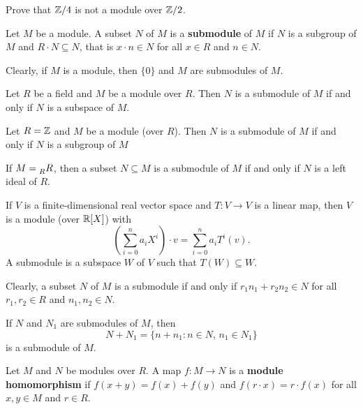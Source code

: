 \begin{exercise}
	\label{xca:Z4overZ2}
	Prove that $\mathbb{Z}/4$ is not a module over $\mathbb{Z}/2$. 
\end{exercise}

\begin{definition}
	Let $M$ be a module. A subset $N$ of $M$ is a \textbf{submodule} of $M$ if 
	$N$ is a subgroup of $M$ and $R\cdot N\subseteq N$, that is 
	$x\cdot n\in N$ for all $x\in R$ and $n\in N$. 
\end{definition}

Clearly, if $M$ is a module, then $\{0\}$ and $M$ are submodules of $M$. 

\begin{example}
Let $R$ be a field and $M$ be a module over $R$. Then
$N$ is a submodule of $M$ if and only if $N$ is a subspace of $M$. 
\end{example}

\begin{example}
Let $R=\mathbb{Z}$ and $M$ be a module (over $R$). Then
$N$ is a submodule of $M$ if and only if $N$ is a subgroup of $M$
\end{example}

\begin{example}
If $M=\prescript{}{R}R$, then a subset $N\subseteq M$ is a submodule
of $M$ if and only if $N$ is a left ideal of $R$. 
\end{example}

\begin{example}
If $V$ is a finite-dimensional real vector space and $T\colon V\to V$ is a linear map, then
$V$ is a module (over $\mathbb{R}[X]$) with  
\[
\left(\sum_{i=0}^na_iX^i\right)\cdot v=\sum_{i=0}^na_iT^i(v).
\]
A submodule is a subspace $W$ 
of $V$ such that $T(W)\subseteq W$. 
\end{example}

Clearly, a subset $N$ of $M$ is a submodule if and only 
if $r_1n_1+r_2n_2\in N$ for all
$r_1,r_2\in R$ and $n_1,n_2\in N$. 	

\begin{exercise}
If $N$ and $N_1$ are submodules of $M$, then 
\[
N+N_1=\{n+n_1:n\in N,\,n_1\in N_1\}
\]
is a submodule of $M$.
\end{exercise}

\begin{definition}
Let $M$ and $N$ be modules over $R$. 
A map $f\colon M\to N$ is a \textbf{module homomorphism} if $f(x+y)=f(x)+f(y)$ and 
$f(r\cdot x)=r\cdot f(x)$ for all $x,y\in M$ and $r\in R$. 
\end{definition}

